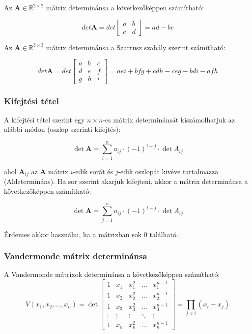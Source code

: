 \documentclass{article}
\begin{document}
Az $\mathbf{A} \in \mathbb{R}^{2 \times 2}$ mátrix determinánsa a következőképpen számítható:

\begin{equation*}
    det \mathbf{A} = det \begin{bmatrix} a & b \\ c & d \end{bmatrix} = ad - bc
\end{equation*}

Az $\mathbf{A} \in \mathbb{R}^{3 \times 3}$ mátrix determinánsa a Szarrusz szabály szerint számítható:

\begin{equation*}
    det \mathbf{A} = det \begin{bmatrix} a & b & c \\ d & e & f \\ g & h & i \end{bmatrix} = aei + bfg + cdh - ceg - bdi - afh
\end{equation*}

\subsubsection{Kifejtési tétel} 

A kifejtési tétel szerint egy $n \times n$-es mátrix determinánsát kiszámolhatjuk az alábbi módon (oszlop szerinti kifejtés):

\begin{equation*}
    \det \mathbf{A} = \sum_{i = 1}^{n} a_{ij} \cdot (-1)^{i+j} \cdot \det A_{ij}
\end{equation*}

ahol $\mathbf{A}_{ij}$ az $\mathbf{A}$ mátrix $i$-edik sorát és $j$-edik oszlopát kivéve tartalmazza (Aldetermináns). \newline Ha sor szerint akarjuk kifejteni, akkor a mátrix determinánsa a következőképpen számítható:

\begin{equation*}
    \det \mathbf{A} = \sum_{j = 1}^{n} a_{ij} \cdot (-1)^{i+j} \cdot \det A_{ij}
\end{equation*}

Érdemes akkor használni, ha a mátrixban sok 0 található.

\subsubsection{Vandermonde mátrix determinánsa}

A Vandermonde mátrixok determinánsa a következőképpen számítható:
\begin{equation*}
    V(x_1, x_2, \ldots, x_n) = \det \begin{bmatrix} 1 & x_1 & x_1^2 & \ldots & x_1^{n-1} \\ 1 & x_2 & x_2^2 & \ldots & x_2^{n-1} \\ 1 & x_3 & x_3^2 & \ldots & x_3^{n-1} \\ \vdots & \vdots & \vdots & \ddots & \vdots \\ 1 & x_n & x_n^2 & \ldots & x_n^{n-1} \end{bmatrix} = \prod_{j < i} (x_i - x_j)
\end{equation*}
\end{document}
